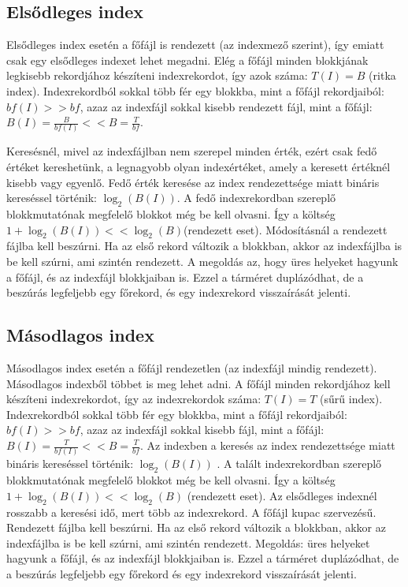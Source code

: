 \documentclass[margin=0px]{article}
\begin{document}
\subsection{Elsődleges index}

Elsődleges index esetén a főfájl  is  rendezett  (az  indexmező  szerint), így emiatt csak egy elsődleges
indexet lehet megadni.  Elég  a  főfájl  minden  blokkjának  legkisebb  rekordjához  készíteni
indexrekordot, így azok száma: $T(I)  = B$ (ritka index). Indexrekordból sokkal több fér egy blokkba, mint
a  főfájl  rekordjaiból:  $bf(I)  >> bf$,  azaz  az  indexfájl  sokkal  kisebb  rendezett  fájl,  mint  a  főfájl:
$B(I) = \frac{B}{bf(I)} << B = \frac{T}{bf}$.

Keresésnél, mivel az indexfájlban nem szerepel minden érték, ezért csak fedő értéket kereshetünk, a
legnagyobb olyan indexértéket, amely a keresett értéknél kisebb vagy egyenlő. Fedő érték keresése
az index rendezettsége miatt bináris kereséssel történik: $\log_{2}(B(I))$. A fedő indexrekordban szereplő
blokkmutatónak megfelelő blokkot még be kell olvasni. Így a költség $1+\log_{2}(B(I)) << \log_{2}(B)$(rendezett
eset).
Módosításnál a rendezett fájlba kell beszúrni. Ha az első rekord változik a blokkban, akkor az
indexfájlba is be kell szúrni, ami szintén rendezett. A megoldás az, hogy üres helyeket hagyunk a
főfájl, és az indexfájl blokkjaiban is. Ezzel a tárméret duplázódhat, de a beszúrás legfeljebb egy
főrekord, és egy indexrekord visszaírását jelenti.

\subsection{Másodlagos index}

Másodlagos index esetén a főfájl rendezetlen (az indexfájl mindig rendezett). Másodlagos indexből
többet is meg lehet adni. A főfájl minden rekordjához kell készíteni indexrekordot, így az
indexrekordok száma: $T(I) = T$ (sűrű index). Indexrekordból sokkal több fér egy blokkba, mint a főfájl
rekordjaiból: $bf(I) >> bf$, azaz az indexfájl sokkal kisebb fájl, mint a főfájl: $B(I) = \frac{T}{bf(I)} <<
    B=\frac{T}{bf}$.
Az indexben a keresés az index rendezettsége miatt bináris kereséssel történik: $\log_{2}(B(I))$ . A talált
indexrekordban szereplő blokkmutatónak megfelelő blokkot még be kell olvasni. Így a költség
$1+\log_{2}(B(I)) << \log_{2}(B)$ (rendezett eset). Az elsődleges indexnél rosszabb a keresési idő, mert több az
indexrekord.
A főfájl kupac szervezésű. Rendezett fájlba kell beszúrni. Ha az első rekord változik a blokkban, akkor
az indexfájlba is be kell szúrni, ami szintén rendezett. Megoldás: üres helyeket hagyunk a főfájl, és az
indexfájl blokkjaiban is. Ezzel a tárméret duplázódhat, de a beszúrás legfeljebb egy főrekord és egy
indexrekord visszaírását jelenti.
\end{document}
